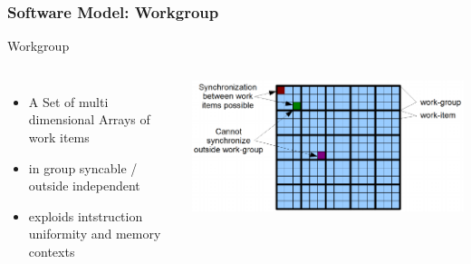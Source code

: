 \documentclass{beamer}
\begin{document}
\begin{frame}
    \frametitle{Software Model: Workgroup}
        Workgroup
        \begin{columns}
            \begin{itemize}
            \item A Set of multi dimensional Arrays of work items\\
            \item in group syncable / outside independent
            \item exploids intstruction uniformity and memory contexts
            \end{itemize} 
            \includegraphics[width=\textwidth]{res/WorkGroupItemStructure.png}   
    \end{columns}
\end{frame}
\end{document}
